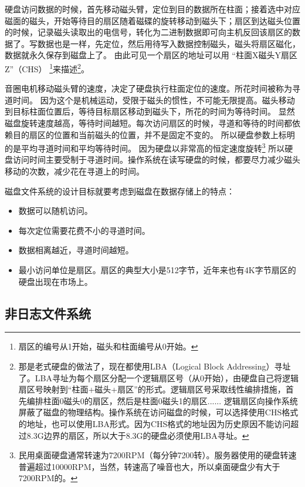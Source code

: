 
硬盘访问数据的时候，首先移动磁头臂，定位到目的数据所在柱面；接着选中对应磁面的磁头，开始等待目的扇区随着磁碟的旋转移动到磁头下；扇区到达磁头位置的时候，记录磁头读取出的电信号，转化为二进制数据即可向主机反回该扇区的数据了。写数据也是一样，先定位，然后用待写入数据控制磁头，磁头将扇区磁化，数据就永久保存到磁盘上了。
由此可见一个扇区的地址可以用 “柱面X磁头Y扇区Z”（CHS） \footnote{扇区的编号从1开始，磁头和柱面编号从0开始。}来描述\footnote{那是老式硬盘的做法了，现在都使用LBA（Logical Block Addressing）寻址了。LBA寻址为每个扇区分配一个逻辑扇区号（从0开始），由硬盘自己将逻辑扇区号映射到“柱面+磁头+扇区”的形式。逻辑扇区号采取线性编排措施，首先编排柱面0磁头0的扇区，然后是柱面0磁头1的扇区...... 逻辑扇区向操作系统屏蔽了磁盘的物理结构。操作系统在访问磁盘的时候，可以选择使用CHS格式的地址，也可以使用LBA形式。因为CHS格式的地址因为历史原因不能访问超过8.3G边界的扇区，所以大于8.3G的硬盘必须使用LBA寻址。}。


音圈电机移动磁头臂的速度，决定了硬盘执行柱面定位的速度。所花时间被称为寻道时间。
因为这个是机械运动，受限于磁头的惯性，不可能无限提高。磁头移动到目标柱面位置后，等待目标扇区移动到磁头下，所花的时间为等待时间。
显然磁盘旋转速度越高，等待时间越短。每次访问扇区的时候，寻道和等待的时间都依赖目的扇区的位置和当前磁头的位置，并不是固定不变的。
所以硬盘参数上标明的是平均寻道时间和平均等待时间。
因为硬盘以非常高的恒定速度旋转\footnote{民用桌面硬盘通常转速为7200RPM（每分钟7200转）。服务器使用的硬盘转速普遍超过10000RPM，当然，转速高了噪音也大，所以桌面硬盘少有大于7200RPM的。}
所以硬盘访问时间主要受制于寻道时间。操作系统在读写硬盘的时候，都要尽力减少磁头移动的次数，减少花在寻道上的时间。


磁盘文件系统的设计目标就要考虑到磁盘在数据存储上的特点：
\begin{itemize}
\item 数据可以随机访问。
\item 每次定位需要花费不小的寻道时间。
\item 数据相离越近，寻道时间越短。
\item 最小访问单位是扇区。扇区的典型大小是512字节，近年来也有4K字节扇区的硬盘出现在市场上。
\end{itemize}

\subsection{非日志文件系统}

